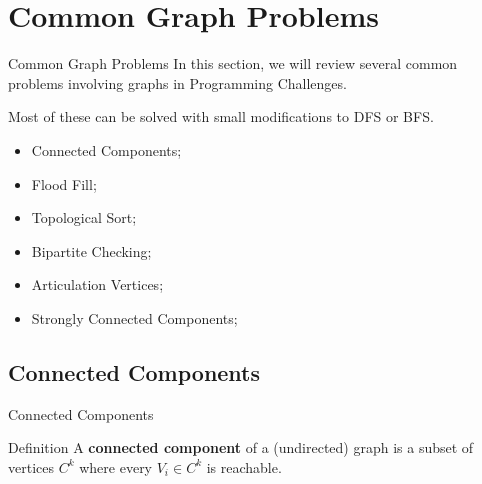 \section{Common Graph Problems}

\begin{frame}{Common Graph Problems}
  In this section, we will review several common problems involving graphs in Programming Challenges.\bigskip

  Most of these can be solved with small modifications to DFS or BFS.\bigskip

  \begin{itemize}
    \item Connected Components;
    \item Flood Fill;
    \item Topological Sort;
    \item Bipartite Checking;
    \item Articulation Vertices;
    \item Strongly Connected Components;
  \end{itemize}
\end{frame}


\subsection{Connected Components}
\begin{frame}{Connected Components}
  \begin{block}{Definition}
    A {\bf connected component} of a (undirected) graph is a subset of vertices $C^k$ where every $V_i \in C^k$ is reachable.\bigskip
  \end{block}

  \vfill
  \begin{center}
  \end{center}
\end{frame}

